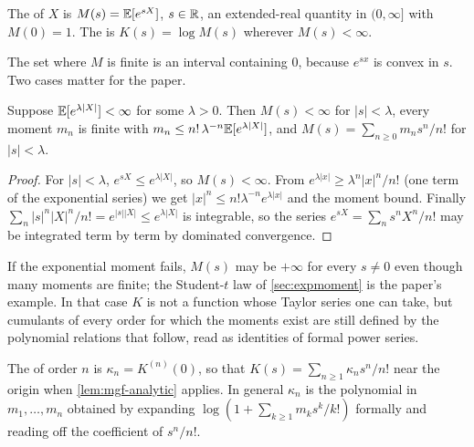 \begin{definition}
The  of $X$ is $M(s)=\mathbb{E}[e^{sX}]$, $s\in\mathbb{R}$, an
extended-real quantity in $(0,\infty]$ with $M(0)=1$. The
 is $K(s)=\log M(s)$ wherever $M(s)<\infty$.
\end{definition}

The set where $M$ is finite is an interval containing $0$, because $e^{sx}$ is convex
in $s$. Two cases matter for the paper.

\begin{lemma}
\label{lem:mgf-analytic}
Suppose $\mathbb{E}[e^{\lambda|X|}]<\infty$ for some $\lambda>0$. Then $M(s)<\infty$ for
$|s|<\lambda$, every moment $m_n$ is finite with $m_n\le n!\,\lambda^{-n}\mathbb{E}[e^{\lambda|X|}]$,
and $M(s)=\sum_{n\ge0}m_ns^n/n!$ for $|s|<\lambda$.
\end{lemma}
\begin{proof}
For $|s|<\lambda$, $e^{sX}\le e^{\lambda|X|}$, so $M(s)<\infty$. From
$e^{\lambda|x|}\ge\lambda^n|x|^n/n!$ (one term of the exponential series) we get
$|x|^n\le n!\lambda^{-n}e^{\lambda|x|}$ and the moment bound. Finally
$\sum_n|s|^n|X|^n/n!=e^{|s||X|}\le e^{\lambda|X|}$ is integrable, so the series
$e^{sX}=\sum_ns^nX^n/n!$ may be integrated term by term by dominated convergence.
\end{proof}

If the exponential moment fails, $M(s)$ may be $+\infty$ for every $s\ne0$ even
though many moments are finite; the Student-$t$ law of \cref{sec:expmoment} is the
paper's example. In that case $K$ is not a function whose Taylor series one can take,
but cumulants of every order for which the moments exist are still defined by the
polynomial relations that follow, read as identities of formal power series.

\begin{definition}[Cumulants]
The  of order $n$ is $\kappa_n=K^{(n)}(0)$, so that
$K(s)=\sum_{n\ge1}\kappa_ns^n/n!$ near the origin when \cref{lem:mgf-analytic} applies.
In general $\kappa_n$ is the polynomial in $m_1,\dots,m_n$ obtained by expanding
$\log(1+\sum_{k\ge1}m_ks^k/k!)$ formally and reading off the coefficient of $s^n/n!$.
\end{definition}

